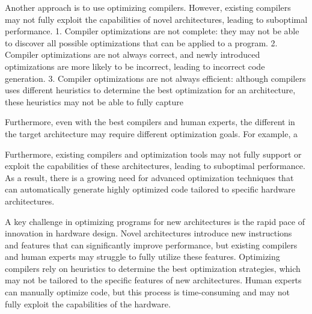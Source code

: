 Another approach is to use optimizing compilers. However, existing
compilers may not fully exploit the capabilities of novel
architectures, leading to suboptimal performance.
%
1. Compiler optimizations are not complete: they may not be able to
discover all possible optimizations that can be applied to a program.
%
2. Compiler optimizations are not always correct, and newly introduced
optimizations are more likely to be incorrect, leading to incorrect
code generation.
%
3. Compiler optimizations are not always efficient: although compilers
uses different heuristics to determine the best optimization for an
architecture, these heuristics may not be able to fully capture
























Furthermore, even with the best compilers and human experts, the
different in the target architecture may require different
optimization goals. For example, a








Furthermore, existing compilers and optimization tools may not fully
support or exploit the capabilities of these architectures, leading to
suboptimal performance. As a result, there is a growing need for
advanced optimization techniques that can automatically generate
highly optimized code tailored to specific hardware architectures.

A key challenge in optimizing programs for new architectures is the
rapid pace of innovation in hardware design. Novel architectures
introduce new instructions and features that can significantly improve
performance, but existing compilers and human experts may
struggle to fully utilize these features. Optimizing compilers rely on
heuristics to determine the best optimization strategies, which may not
be tailored to the specific features of new architectures. Human
experts can manually optimize code, but this process is time-consuming
and may not fully exploit the capabilities of the hardware.






